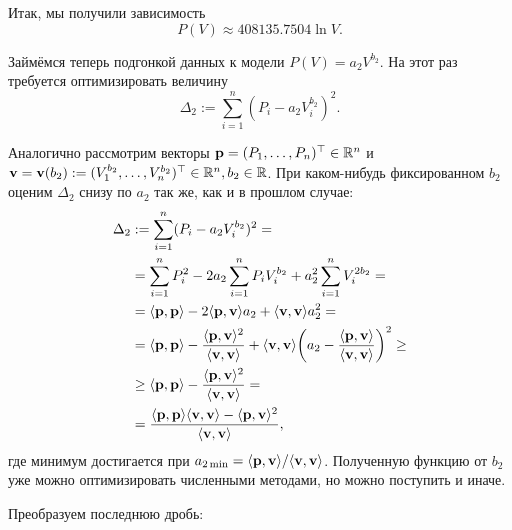 Итак, мы получили зависимость 
\begin{equation} \label{eq:eq3}
P(V) \approx 408135.7504 \ln V.
\end{equation}

Займёмся теперь подгонкой данных к модели $P(V)=a_2 V ^{b_2}$. На этот раз требуется оптимизировать величину
\[
\Delta _2 := \sum \limits_{i=1}^n (P_i - a_2 V_i ^{b_2})^2.
\]

Аналогично рассмотрим векторы $\mathbf{p} = (P_1, \ldots, P_n)^\top \in \mathbb{R}^n$ и $\mathbf{v} = \mathbf{v}(b_2) := (V_1^{b_2}, \ldots,\\ V_n^{b_2})^\top \in \mathbb{R}^n, b_2 \in \mathbb{R}$. При каком-нибудь фиксированном $b_2$ оценим $\Delta _2$ снизу по $a_2$ так же, как и в прошлом случае:
\[
\begin{split}
\Delta _2 & := \sum \limits_{i=1}^n (P_i - a_2 V_i ^{b_2})^2 =\\
& = \sum \limits_{i=1}^n P_i^2 - 2a_2 \sum \limits_{i=1}^n P_i V_i^{b_2} + a_2^2 \sum \limits_{i=1}^n V_i^{2 b_2} =\\
& = \langle \mathbf{p}, \mathbf{p} \rangle - 2 \langle \mathbf{p}, \mathbf{v} \rangle a_2 + \langle \mathbf{v}, \mathbf{v} \rangle a_2^2 = \\
& = \langle \mathbf{p}, \mathbf{p} \rangle - \dfrac{\langle \mathbf{p}, \mathbf{v} \rangle^2}{\langle \mathbf{v}, \mathbf{v} \rangle} +
\langle \mathbf{v}, \mathbf{v} \rangle \bigg(  a_2 - \dfrac{\langle \mathbf{p}, \mathbf{v} \rangle}{\langle \mathbf{v}, \mathbf{v} \rangle} \bigg) ^2 \ge \\
& \ge \langle \mathbf{p}, \mathbf{p} \rangle - \dfrac{\langle \mathbf{p}, \mathbf{v} \rangle^2}{\langle \mathbf{v}, \mathbf{v} \rangle} =\\
& = \dfrac{\langle \mathbf{p}, \mathbf{p} \rangle\langle \mathbf{v}, \mathbf{v} \rangle - \langle \mathbf{p}, \mathbf{v} \rangle^2}{\langle \mathbf{v}, \mathbf{v} \rangle},
\end{split}
\]
где минимум достигается при $a_{2 \min}=\langle \mathbf{p}, \mathbf{v} \rangle / \langle \mathbf{v}, \mathbf{v} \rangle$. Полученную функцию от $b_2$ уже можно оптимизировать численными методами, но можно поступить и иначе.\par
Преобразуем последнюю дробь:
